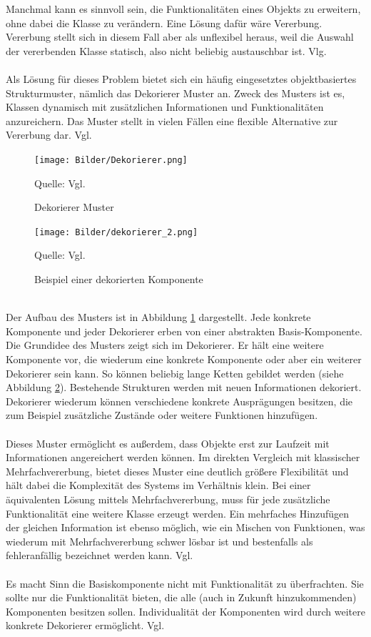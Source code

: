 \documentclass[fontsize=11pt,a4paper,final]{scrreprt}[2003/01/01]
\newcommand*{\quelle}{%
	\footnotesize Quelle: 
}
\begin{document}
Manchmal kann es sinnvoll sein, die Funktionalitäten eines Objekts zu erweitern, ohne dabei die Klasse zu verändern. Eine Lösung dafür wäre Vererbung. Vererbung stellt sich in diesem Fall aber als unflexibel heraus, weil die Auswahl der vererbenden Klasse statisch, also nicht beliebig austauschbar ist. Vlg. \cite[S. 199]{gamma2004}
\\ \\
Als Lösung für dieses Problem bietet sich ein häufig eingesetztes objektbasiertes Strukturmuster, nämlich das Dekorierer Muster an. Zweck des Musters ist es, Klassen dynamisch mit zusätzlichen Informationen und Funktionalitäten anzureichern. Das Muster stellt in vielen Fällen eine flexible Alternative zur Vererbung dar. Vgl. \cite[S. 199 ]{gamma2004}

\begin{figure}[H]
	\centering
	\texttt{[image: Bilder/Dekorierer.png]}
	\caption{Dekorierer Muster}
	\quelle{ Vgl. \cite[S. 201]{gamma2004}}
	\label{fig:Dekorierer}
\end{figure}

\begin{figure}[H]
	\centering
	\texttt{[image: Bilder/dekorierer\_2.png]}
	\caption{Beispiel einer dekorierten Komponente}
	\quelle{Vgl. \cite[S. 205]{gamma2004}} 
	\label{fig:Beispiel einer dekorierten Komponente}
\end{figure}
\ \\
Der Aufbau des Musters ist in Abbildung \ref{fig:Dekorierer} dargestellt. Jede konkrete Komponente und jeder Dekorierer erben von einer abstrakten Basis-Komponente. Die Grundidee des Musters zeigt sich im Dekorierer. Er hält eine weitere Komponente vor, die wiederum eine konkrete Komponente oder aber ein weiterer Dekorierer sein kann. So können beliebig lange Ketten gebildet werden (siehe Abbildung \ref{fig:Beispiel einer dekorierten Komponente}). Bestehende Strukturen werden mit neuen Informationen \glqq dekoriert\grqq. Dekorierer wiederum können verschiedene konkrete Ausprägungen besitzen, die zum Beispiel zusätzliche Zustände oder weitere Funktionen hinzufügen.
\\ \\
Dieses Muster ermöglicht es außerdem, dass Objekte erst zur Laufzeit mit Informationen angereichert werden können. Im direkten Vergleich mit klassischer Mehrfachvererbung, bietet dieses Muster eine deutlich größere Flexibilität und hält dabei die Komplexität des Systems im Verhältnis klein. Bei einer äquivalenten Lösung mittels Mehrfachvererbung, muss für jede zusätzliche Funktionalität eine weitere Klasse erzeugt werden. Ein mehrfaches Hinzufügen der gleichen Information ist ebenso möglich, wie ein Mischen von Funktionen, was wiederum mit Mehrfachvererbung schwer lösbar ist und bestenfalls als fehleranfällig bezeichnet werden kann. Vgl. \cite[S. 203]{gamma2004}
\\ \\
Es macht Sinn die Basiskomponente nicht mit Funktionalität zu überfrachten. Sie sollte nur die Funktionalität bieten, die alle (auch in Zukunft hinzukommenden) Komponenten besitzen sollen. Individualität der Komponenten wird durch weitere konkrete Dekorierer ermöglicht. Vgl. \cite[S. 203 - 204]{gamma2004}
\end{document}
